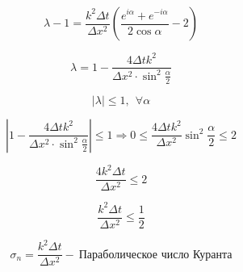 \documentclass[10pt,a4paper]{article}
\begin{document}
		\begin{equation}
			\lambda - 1 = \frac{k^{2}\Delta t}{\Delta x^{2}}\left(
			\frac{e^{i\alpha} + e^{-i\alpha}}{2\cos\alpha} - 2
			\right)
		\end{equation}
		
		\begin{equation}
			\lambda = 1 - \frac{4\Delta tk^{2}}{\Delta x^{2}\cdot \sin^{2}
			\frac{\alpha}{2}}
		\end{equation}
		
		\begin{equation}
			\left|\lambda\right| \leqslant 1, \ \ \forall \alpha
		\end{equation}
		
		\begin{equation}
			\left|1 - \frac{4\Delta tk^{2}}{\Delta x^{2}\cdot \sin^{2}
			\frac{\alpha}{2}}\right| \leqslant 1 \Rightarrow 
			0\leqslant \frac{4\Delta t k^{2}}{\Delta x^{2}}\sin^{2}\frac{\alpha}
			{2} \leqslant 2
		\end{equation}
		
		\begin{equation}
			\frac{4k^{2}\Delta t}{\Delta x^{2}} \leqslant 2
		\end{equation}
		
		\begin{equation}
			\frac{k^{2}\Delta t}{\Delta x^{2}} \leqslant \frac{1}{2}
		\end{equation}
		
		\begin{equation}
			\sigma_{n} = \frac{k^{2}\Delta t}{\Delta x^{2}} - \ \text{
			Параболическое число Куранта}
		\end{equation}
\end{document}
